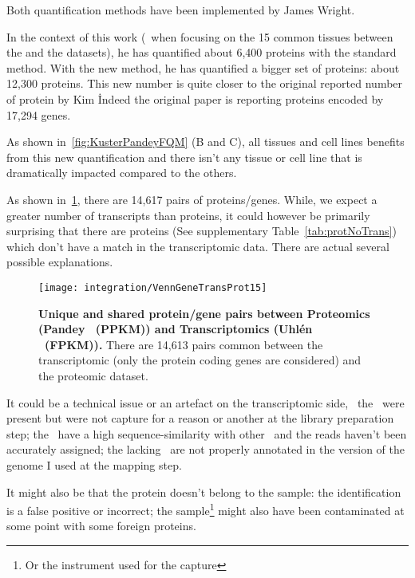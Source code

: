 Both quantification methods have been implemented by James Wright.

In the context of this work (\ie\ when focusing on the 15 common tissues between
the  and the  datasets),
he has quantified about 6,400 proteins with
the standard method. With the new method, he has quantified a bigger set of
proteins: about 12,300 proteins. This new number is quite closer to the original
reported number of protein by Kim \etal\.  Indeed the original paper is
reporting proteins encoded by 17,294 genes.

As shown in~\cref{fig:KusterPandeyFQM} (B and C),
all tissues and cell lines benefits from this new quantification and there isn't
any tissue or cell line that is dramatically impacted compared to the others.

As shown in~\cref{fig:VennGeneTransProt15}, there are 14,617 pairs of
proteins/genes. While, we expect a greater number of transcripts than proteins,
it could however be primarily surprising that there are proteins
(See supplementary Table~\cref{tab:protNoTrans}) which don't have
a match in the transcriptomic data. There are actual several possible explanations.

\begin{figure}[!htbp]
    \texttt{[image: integration/VennGeneTransProt15]}\centering
    \caption[Unique and shared protein/gene pairs between Proteomics
    (Pandey \etal\ (PPKM)) and
    Transcriptomics (Uhlén \etal\ (\gls{FPKM}))]
    {\label{fig:VennGeneTransProt15}\textbf{Unique and shared protein/gene
    pairs between Proteomics (Pandey \etal\ (PPKM)) and Transcriptomics (Uhlén
    \etal\  (\gls{FPKM})).} There are 14,613 pairs common between the
    transcriptomic (only the protein coding genes are considered)
    and the proteomic dataset.}
\end{figure}

It could be a technical issue or an artefact on the transcriptomic side, \eg\
the \mRNAs\ were present but were not capture for a reason or another at the
library preparation step; the \mRNAs\ have a high sequence-similarity with other
\mRNAs\ and the reads haven't been accurately assigned; the lacking \mRNAs\ are
not properly annotated in the version of the genome I used at the mapping step.

It might also be that the protein doesn't belong to the sample: the identification
is a false positive or incorrect; the sample\footnote{Or the instrument used for
the capture} might also have been contaminated at some point with some foreign
proteins.


